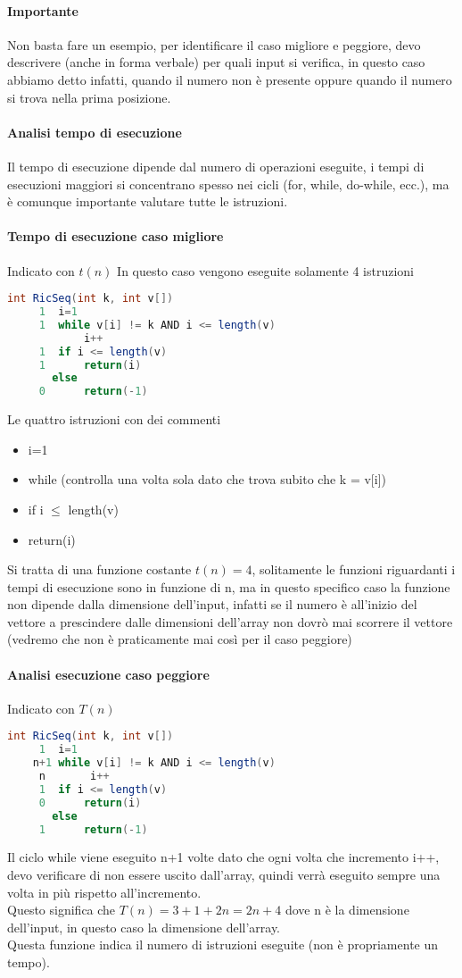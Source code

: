 \paragraph*{Importante} Non basta fare un esempio, per identificare il caso migliore e peggiore,
devo descrivere (anche in forma verbale) per quali input si verifica, in questo caso abbiamo detto infatti, quando
il numero non è presente oppure quando il numero si trova nella prima posizione.
\paragraph*{Analisi tempo di esecuzione} Il tempo di esecuzione dipende dal numero di operazioni
eseguite, i tempi di esecuzioni maggiori si concentrano spesso nei cicli (for, while, do-while, ecc.),
ma è comunque importante valutare tutte le istruzioni.
\paragraph*{Tempo di esecuzione caso migliore} Indicato con $t(n)$ In questo caso vengono eseguite solamente 4 istruzioni
\begin{lstlisting}[language=Java]
    int RicSeq(int k, int v[])
     1  i=1
     1  while v[i] != k AND i <= length(v)
            i++
     1  if i <= length(v)
     1      return(i)
       else
     0      return(-1)
\end{lstlisting}
Le quattro istruzioni con dei commenti
\begin{itemize}
    \item i=1
    \item while (controlla una volta sola dato che trova subito che k = v[i])
    \item if i $\leq$ length(v) 
    \item return(i)
\end{itemize}
Si tratta di una funzione costante $t(n) = 4$, solitamente le funzioni riguardanti i tempi
di esecuzione sono in funzione di n, ma in questo specifico caso la funzione non dipende
dalla dimensione dell'input, infatti se il numero è all'inizio del vettore a prescindere dalle
dimensioni dell'array non dovrò mai scorrere il vettore (vedremo che non è praticamente mai così per
il caso peggiore)
\paragraph*{Analisi esecuzione caso peggiore} Indicato con $T(n)$
\begin{lstlisting}[language=Java]
    int RicSeq(int k, int v[])
     1  i=1
    n+1 while v[i] != k AND i <= length(v)
     n       i++
     1  if i <= length(v)
     0      return(i)
       else
     1      return(-1)
\end{lstlisting}
Il ciclo while viene eseguito n+1 volte dato che ogni volta che incremento i++, devo
verificare di non essere uscito dall'array, quindi verrà eseguito sempre una volta in più
rispetto all'incremento.\\
Questo significa che $T(n) = 3 + 1 +2n = 2n + 4$ dove n è la dimensione dell'input, in
questo caso la dimensione dell'array.\\
Questa funzione indica il numero di istruzioni eseguite (non è propriamente un tempo).\\
